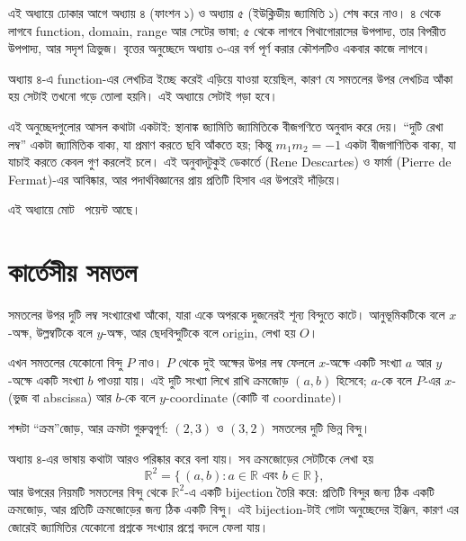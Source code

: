 \documentclass[11pt]{article}
\begin{document}

\noindent
এই অধ্যায়ে ঢোকার আগে অধ্যায় ৪ (ফাংশন ১) ও অধ্যায় ৫ (ইউক্লিডীয়
জ্যামিতি ১) শেষ করে নাও। ৪ থেকে লাগবে function, domain, range আর সেটের ভাষা;
৫ থেকে লাগবে পিথাগোরাসের উপপাদ্য, তার বিপরীত উপপাদ্য, আর সদৃশ ত্রিভুজ। বৃত্তের
অনুচ্ছেদে অধ্যায় ৩-এর বর্গ পূর্ণ করার কৌশলটিও একবার কাজে লাগবে।

অধ্যায় ৪-এ function-এর লেখচিত্র ইচ্ছে
করেই এড়িয়ে যাওয়া হয়েছিল, কারণ যে সমতলের উপর লেখচিত্র আঁকা হয় সেটাই তখনো গড়ে তোলা হয়নি। এই অধ্যায়ে সেটাই গড়া হবে।

এই অনুচ্ছেদগুলোর আসল কথাটা একটাই: স্থানাঙ্ক জ্যামিতি জ্যামিতিকে বীজগণিতে
অনুবাদ করে দেয়। ``দুটি রেখা লম্ব'' একটা জ্যামিতিক বাক্য, যা প্রমাণ করতে ছবি
আঁকতে হয়; কিন্তু $m_1 m_2 = -1$ একটা বীজগাণিতিক বাক্য, যা যাচাই করতে কেবল
গুণ করলেই চলে। এই অনুবাদটুকুই ডেকার্তে (Rene Descartes) ও ফার্মা (Pierre de Fermat)-এর আবিষ্কার, আর পদার্থবিজ্ঞানের
প্রায় প্রতিটি হিসাব এর উপরেই দাঁড়িয়ে।

এই অধ্যায়ে মোট \totalpoints\ পয়েন্ট আছে।

\section{কার্তেসীয় সমতল}

\begin{idea}[সমতলের স্থানাঙ্ক]
সমতলের উপর দুটি লম্ব সংখ্যারেখা আঁকো, যারা একে অপরকে দুজনেরই শূন্য বিন্দুতে
কাটে। আনুভূমিকটিকে বলে $x$-অক্ষ, উল্লম্বটিকে বলে $y$-অক্ষ, আর ছেদবিন্দুটিকে
বলে origin, লেখা হয় $O$।

এখন সমতলের যেকোনো বিন্দু $P$ নাও। $P$ থেকে দুই অক্ষের উপর লম্ব ফেললে $x$-অক্ষে
একটি সংখ্যা $a$ আর $y$-অক্ষে একটি সংখ্যা $b$ পাওয়া যায়। এই দুটি সংখ্যা লিখে
রাখি ক্রমজোড় $(a, b)$ হিসেবে; $a$-কে বলে $P$-এর $x$- (ভুজ বা abscissa) আর $b$-কে বলে
$y$-coordinate (কোটি বা coordinate)।

শব্দটা ``ক্রম''জোড়, আর ক্রমটা গুরুত্বপূর্ণ: $(2, 3)$ ও $(3, 2)$ সমতলের দুটি
ভিন্ন বিন্দু।
\end{idea}

\noindent
অধ্যায় ৪-এর ভাষায় কথাটা আরও পরিষ্কার করে বলা যায়। সব ক্রমজোড়ের সেটটিকে
লেখা হয়
\[
  \mathbb{R}^2 = \{\, (a, b) : a \in \mathbb{R} \text{ এবং } b \in \mathbb{R} \,\},
\]
আর উপরের নিয়মটি সমতলের বিন্দু থেকে $\mathbb{R}^2$-এ একটি bijection তৈরি করে:
প্রতিটি বিন্দুর জন্য ঠিক একটি ক্রমজোড়, আর প্রতিটি ক্রমজোড়ের জন্য ঠিক একটি
বিন্দু। এই bijection-টাই গোটা অনুচ্ছেদের ইঞ্জিন, কারণ এর জোরেই জ্যামিতির যেকোনো
প্রশ্নকে সংখ্যার প্রশ্নে বদলে ফেলা যায়।
\end{document}
